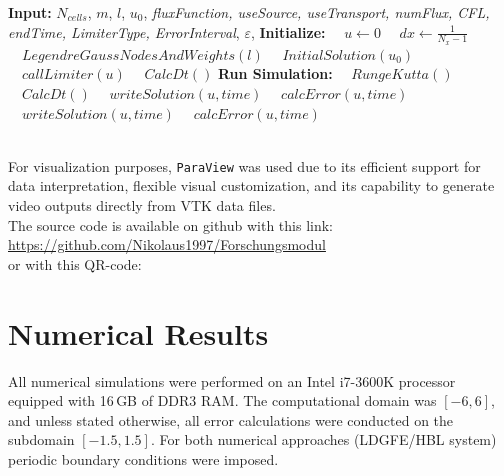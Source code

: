 \documentclass[a4paper,12pt]{paper}
\begin{document}
\begin{algorithm}
	\caption{Rough representation of the simulation loop}
	\begin{algorithmic}[1]
		\STATE \textbf{Input:} $N_{cells}$, $m$, $l$, $u_0$, \textit{fluxFunction, useSource, useTransport, numFlux, CFL, endTime, LimiterType, ErrorInterval}, $\varepsilon$,
		\STATE \textbf{Initialize:}
		\STATE $\quad u \gets 0$ \hfill{}
		\STATE $\quad dx \gets \frac{1}{N_x - 1}$ \hfill {}
		\STATE $\quad LegendreGaussNodesAndWeights(l)$\hfill {}
		\STATE $\quad InitialSolution(u_0)$ \hfill {}
		\STATE $\quad callLimiter(u) $\hfill {}
		\STATE $\quad CalcDt()$\hfill {}
		\STATE \textbf{Run Simulation:}
		\STATE $\quad RungeKutta()$\hfill{}
		\STATE $\quad CalcDt()$ \hfill {}
		\STATE $\quad writeSolution(u,time)$
		\STATE $\quad calcError(u,time)$
		\ENDIF
		\ENDWHILE
		\STATE $\quad writeSolution(u,time)$
		\STATE $\quad calcError(u,time)$
	\end{algorithmic}
	\label{alg:Programm}
\end{algorithm}\\
For visualization purposes, \texttt{ParaView} was used due to its efficient support for data interpretation, flexible visual customization, and its capability to generate video outputs directly from VTK data files.\\
The source code is available on github with this link:\\ \hyperlink{https://github.com/Nikolaus1997/Forschungsmodul}{https://github.com/Nikolaus1997/Forschungsmodul}\\
or with this QR-code:\\ \hspace{3cm} 
\clearpage
\section{Numerical Results}\label{sec:numerical-results}
All numerical simulations were performed on an Intel i7-3600K processor equipped with 16\,GB of DDR3 RAM. The computational domain was \([-6,6]\), and unless stated otherwise, all error calculations were conducted on the subdomain \([-1.5,1.5]\). For both numerical approaches (LDGFE/HBL system) periodic boundary conditions were imposed.
\end{document}
